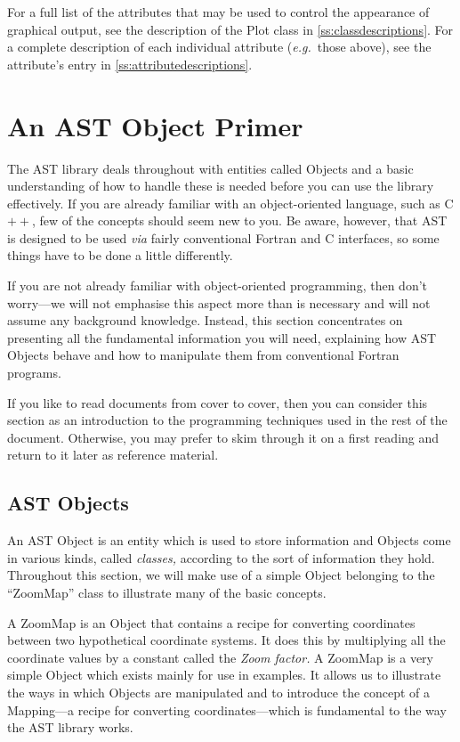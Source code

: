\documentclass[twoside,11pt]{article}
\newcommand{\htmlref}[2]{#1}
\newcommand{\appref}[1]{Appendix~\ref{#1}}
\renewcommand{\appref}[1]{\ref{#1}}
\begin{document}
For a full list of the attributes that may be used to control the
appearance of graphical output, see the description of the Plot class
in \appref{ss:classdescriptions}. For a complete description of each
individual attribute ({\em{e.g.}}\ those above), see the attribute's
entry in \appref{ss:attributedescriptions}.

\cleardoublepage
\section{\label{ss:primer}An AST Object Primer}

The AST library deals throughout with entities called Objects and a
basic understanding of how to handle these is needed before you can
use the library effectively.  If you are already familiar with an
object-oriented language, such as C$++$, few of the concepts should
seem new to you.  Be aware, however, that AST is designed to be used
{\em{via}} fairly conventional Fortran and C interfaces, so some
things have to be done a little differently.

If you are not already familiar with object-oriented programming, then
don't worry---we will not emphasise this aspect more than is necessary
and will not assume any background knowledge.  Instead, this section
concentrates on presenting all the fundamental information you will
need, explaining how AST Objects behave and how to manipulate them
from conventional Fortran programs.

If you like to read documents from cover to cover, then you can
consider this section as an introduction to the programming techniques
used in the rest of the document. Otherwise, you may prefer to skim
through it on a first reading and return to it later as reference
material.

\subsection{AST Objects}

An AST \htmlref{Object}{Object} is an entity which is used to store information and
Objects come in various kinds, called {\em{classes,}} according to the
sort of information they hold. Throughout this section, we will make
use of a simple Object belonging to the ``\htmlref{ZoomMap}{ZoomMap}'' class to
illustrate many of the basic concepts.

A ZoomMap is an Object that contains a recipe for converting
coordinates between two hypothetical coordinate systems.  It does this
by multiplying all the coordinate values by a constant called the
{\em{\htmlref{Zoom}{Zoom} factor.}}  A ZoomMap is a very simple Object which exists
mainly for use in examples. It allows us to illustrate the ways in
which Objects are manipulated and to introduce the concept of a
\htmlref{Mapping}{Mapping}---a recipe for converting coordinates---which is fundamental
to the way the AST library works.
\end{document}
